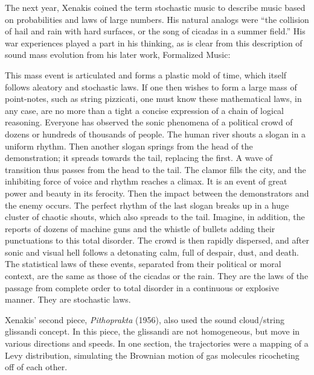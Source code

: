 The next year, Xenakis coined the term stochastic music to describe music based on probabilities and laws of large numbers. His natural analogs were ``the collision of hail and rain with hard surfaces, or the song of cicadas in a summer field.'' His war experiences played a part in his thinking, as is clear from this description of sound mass evolution from his later work, Formalized Music:

This mass event is articulated and forms a plastic mold of time, which itself follows aleatory and stochastic laws. If one then wishes to form a large mass of point-notes, such as string pizzicati, one must know these mathematical laws, in any case, are no more than a tight a concise expression of a chain of logical reasoning. Everyone has observed the sonic phenomena of a political crowd of dozens or hundreds of thousands of people. The human river shouts a slogan in a uniform rhythm. Then another slogan springs from the head of the demonstration; it spreads towards the tail, replacing the first. A wave of transition thus passes from the head to the tail. The clamor fills the city, and the inhibiting force of voice and rhythm reaches a climax. It is an event of great power and beauty in its ferocity. Then the impact between the demonstrators and the enemy occurs. The perfect rhythm of the last slogan breaks up in a huge cluster of chaotic shouts, which also spreads to the tail. Imagine, in addition, the reports of dozens of machine guns and the whistle of bullets adding their punctuations to this total disorder. The crowd is then rapidly dispersed, and after sonic and visual hell follows a detonating calm, full of despair, dust, and death. The statistical laws of these events, separated from their political or moral context, are the same as those of the cicadas or the rain. They are the laws of the passage from complete order to total disorder in a continuous or explosive manner. They are stochastic laws.

Xenakis' second piece, \textit{Pithoprakta} (1956), also used the sound cloud/string glissandi concept. In this piece, the glissandi are not homogeneous, but move in various directions and speeds. In one section, the trajectories were a mapping of a Levy distribution, simulating the Brownian motion of gas molecules ricocheting off of each other.





